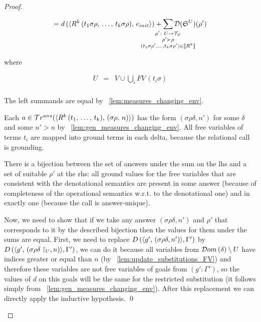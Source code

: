 \begin{proof}
\begin{enumerate}
\begin{enumerate}
	\[ = d\,(\taskst{\invokegoal{R^k}{t_1 \sigma \rho}{t_k \sigma \rho}}{e_{init}}) +
      \smashoperator{\sum\limits_{\substack{ \rho' \colon U \to \grterms \\
                                      \rho' \succ \rho \\
                                      (t_1 \sigma \rho', \dots, t_k \sigma \rho') \in \sembr{R^k}  }}}
           \mathcal{D}(\schemewithvset{\mathfrak{S}}{U})(\rho')  \]
           
    where
    
    \[ \begin{array}{lcl}
    U & = &  V \cup \bigcup_{i} FV\,(t_i \sigma) \\
    \end{array} \]
    
    The left summands are equal by \lemmaword~\ref{lem:measures_changing_env}.
    
    Each $a \in \mathcal{T}r^{ans}(\langle R^k\,(t_1, \, \dots, \, t_k) ,\, (\sigma\rho ,\, n) \rangle)$ has the form $(\sigma \rho \delta, n')$ for some $\delta$ and some $n' > n$ by \lemmaword~\ref{lem:gen_measures_changing_env}. All free variables of terms $t_i$ are mapped into ground terms in each delta, because the relational call is grounding.
    
    There is a bijection between the set of answers under the sum on the lhs and a set of suitable $\rho'$ at the rhs: all ground values for the free variables that are consistent with the denotational semantics are present in some answer (because of completeness of the operational semantics w.r.t. to the denotational one) and in exactly one (because the call is answer-unique).
    
    Now, we need to show that if we take any answer $(\sigma \rho \delta, n')$ and $\rho'$ that corresponds to it by the described bijection then the values for them under the sums are equal. First, we need to replace $D\,(\langle g' ,\, (\sigma \rho \delta, n') \rangle, \Gamma')$ by $D\,(\langle g' ,\, (\sigma \rho \delta\restriction_U, n) \rangle, \Gamma')$, we can do it because all variables from $\mathcal{D}om\,(\delta) \setminus U$ have indices greater or equal than $n$ (by \lemmaword~\ref{lem:update_substitutions_FV}) and therefore these variables are not free variables of goals from $(g' : \Gamma')$, so the values of $d$ on this goals will be the same for the restricted substitution (it follows simply from \lemmaword~\ref{lem:gen_measures_changing_env}). After this replacement we can directly apply the inductive hypothesis.
    \qed
	
	\end{enumerate}


\end{enumerate}
\end{proof}
